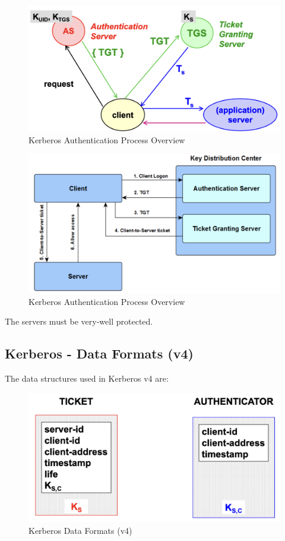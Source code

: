 \begin{multicols}{2}

    \begin{figure}[H]
        \centering
        \includegraphics[width=\linewidth]{Images/Authentication/kerberosOverview.png}
        \caption{Kerberos Authentication Process Overview}
    \end{figure}
    \columnbreak

    \begin{figure}[H]
        \centering
        \includegraphics[width=\linewidth]{Images/Authentication/ker.png}
        \caption{Kerberos Authentication Process Overview}
    \end{figure}
    
\end{multicols}

\begin{tcolorbox}[colback=red!10!white, colframe=red!70!black, coltitle=white, title=Beware]
The servers must be very-well protected.
\end{tcolorbox}

\subsection*{Kerberos - Data Formats (v4)}
The data structures used in Kerberos v4 are:
\begin{figure}[H]
    \centering
    \includegraphics[width=0.5\linewidth]{Images/Authentication/kerDataFormats.png}
    \caption{Kerberos Data Formats (v4)}
\end{figure}

